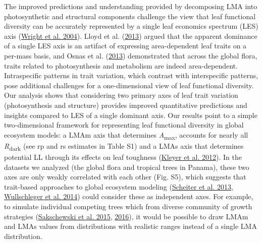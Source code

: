 \documentclass[
  12pt,
]{article}
\begin{document}
The improved predictions and understanding provided by decomposing LMA into photosynthetic and structural components challenge the view that leaf functional diversity can be accurately represented by a single leaf economics spectrum (LES) axis (\protect\hyperlink{ref-Wright2004a}{Wright et al. 2004}).
Lloyd et al. (\protect\hyperlink{ref-Lloyd2013}{2013}) argued that the apparent dominance of a single LES axis is an artifact of expressing area-dependent leaf traits on a per-mass basis, and Osnas et al. (\protect\hyperlink{ref-Osnas2013}{2013}) demonstrated that across the global flora, traits related to photosynthesis and metabolism are indeed area-dependent.
Intraspecific patterns in trait variation, which contrast with interspecific patterns, pose additional challenges for a one-dimensional view of leaf functional diversity. Our analysis shows that considering two primary axes of leaf trait variation (photosynthesis and structure) provides improved quantitative predictions and insights compared to LES of a single dominant axis.
Our results point to a simple two-dimensional framework for representing leaf functional diversity in global ecosystem models: a LMAm axis that determines \emph{A}\textsubscript{max}, accounts for nearly all \emph{R}\textsubscript{dark} (see rp and rs estimates in Table S1) and a LMAs axis that determines potential LL through its effects on leaf toughness (\protect\hyperlink{ref-Kleyer2012}{Kleyer et al. 2012}).
In the datasets we analyzed (the global flora and tropical trees in Panama), these two axes are only weakly correlated with each other (Fig. S5), which suggests that trait-based approaches to global ecosystem modeling (\protect\hyperlink{ref-Scheiter2013}{Scheiter et al. 2013}, \protect\hyperlink{ref-Wullschleger2014}{Wullschleger et al. 2014}) could consider these as independent axes.
For example, to simulate individual competing trees which from diverse community of growth strategies (\protect\hyperlink{ref-Sakschewski2015}{Sakschewski et al. 2015}, \protect\hyperlink{ref-Sakschewski2016}{2016}), it would be possible to draw LMAm and LMAs values from distributions with realistic ranges instead of a single LMA distribution.
\end{document}

